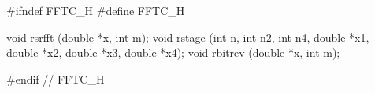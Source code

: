 #ifndef FFTC_H
#define FFTC_H

\code
void rsrfft (double *x, int m);
void rstage (int n, int n2, int n4, double *x1, double *x2, double *x3, double *x4);
void rbitrev (double *x, int m);
\endcode

#endif // FFTC_H
